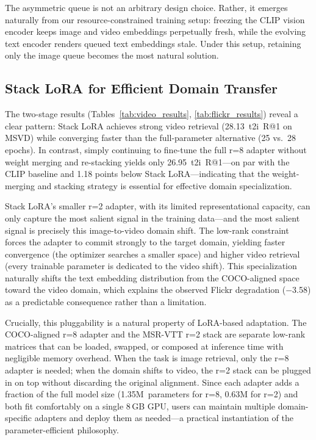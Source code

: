 \documentclass[10pt,leqno]{amsart}
\begin{document}
The asymmetric queue is not an arbitrary design choice. Rather, it emerges naturally from our resource-constrained training setup: freezing the CLIP vision encoder keeps image and video embeddings perpetually fresh, while the evolving text encoder renders queued text embeddings stale. Under this setup, retaining only the image queue becomes the most natural solution.

\subsection{Stack LoRA for Efficient Domain Transfer}

The two-stage results (Tables~\ref{tab:video_results}, \ref{tab:flickr_results}) reveal a clear pattern: Stack LoRA achieves strong video retrieval (28.13~t2i~R@1 on MSVD) while converging faster than the full-parameter alternative (25 vs.\ 28 epochs). In contrast, simply continuing to fine-tune the full r=8 adapter without weight merging and re-stacking yields only 26.95~t2i~R@1---on par with the CLIP baseline and 1.18 points below Stack LoRA---indicating that the weight-merging and stacking strategy is essential for effective domain specialization.

Stack LoRA's smaller r=2 adapter, with its limited representational capacity, can only capture the most salient signal in the training data---and the most salient signal is precisely this image-to-video domain shift. The low-rank constraint forces the adapter to commit strongly to the target domain, yielding faster convergence (the optimizer searches a smaller space) and higher video retrieval (every trainable parameter is dedicated to the video shift). This specialization naturally shifts the text embedding distribution from the COCO-aligned space toward the video domain, which explains the observed Flickr degradation ($-$3.58) as a predictable consequence rather than a limitation.

Crucially, this pluggability is a natural property of LoRA-based adaptation. The COCO-aligned r=8 adapter and the MSR-VTT r=2 stack are separate low-rank matrices that can be loaded, swapped, or composed at inference time with negligible memory overhead. When the task is image retrieval, only the r=8 adapter is needed; when the domain shifts to video, the r=2 stack can be plugged in on top without discarding the original alignment. Since each adapter adds a fraction of the full model size (1.35M~parameters for r=8, 0.63M for r=2) and both fit comfortably on a single 8\,GB GPU, users can maintain multiple domain-specific adapters and deploy them as needed---a practical instantiation of the parameter-efficient philosophy.
\end{document}
